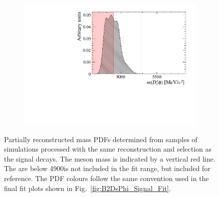 \begin{figure}[!h]
    \centering
    \begin{subfigure}[t]{0.49\textwidth}
        \includegraphics[width=1.0\textwidth]{figs/B2DsPhi/Bs2DsstKKst_4600_5900_Shape.pdf}
    \end{subfigure}
    \caption{Partially reconstructed mass PDFs determined from samples of \decay{\Bsb}{\Dssp\Km\Kstarz} simulations processed with the same reconstruction and selection as the signal decays. The \Bp meson mass is indicated by a vertical red line. The are below 4900\mevcc is not included in the fit range, but included for reference. The PDF colours follow the same convention used in the final fit plots shown in Fig.~\ref{fig:B2DsPhi_Signal_Fit}.}
    \label{fig:B2DsPhi_part_reco_shapes_DsKKstar}   
\end{figure}

